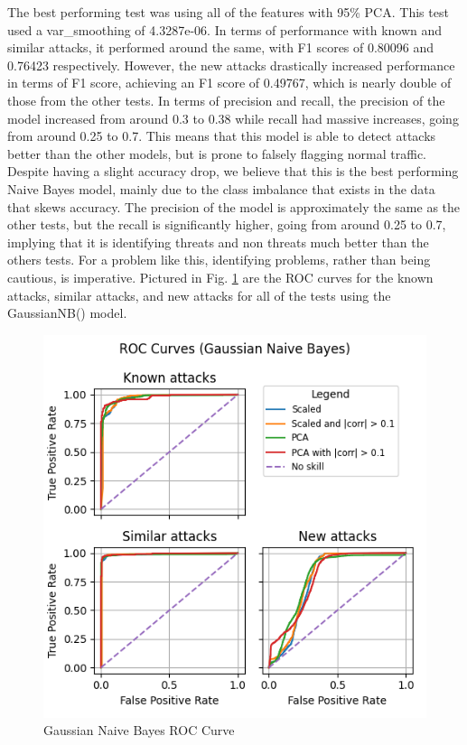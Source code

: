 The best performing test was using all of the features with 95\% PCA. This test used a var\_smoothing of 4.3287e-06. In terms of performance with known and similar attacks, it performed around the same, with F1 scores of 0.80096 and 0.76423 respectively. However, the new attacks drastically increased performance in terms of F1 score, achieving an F1 score of 0.49767, which is nearly double of those from the other tests. In terms of precision and recall, the precision of the model increased from around 0.3 to 0.38 while recall had massive increases, going from around 0.25 to 0.7. This means that this model is able to detect attacks better than the other models, but is prone to falsely flagging normal traffic. Despite having a slight accuracy drop, we believe that this is the best performing Naive Bayes model, mainly due to the class imbalance that exists in the data that skews accuracy. The precision of the model is approximately the same as the other tests, but the recall is significantly higher, going from around 0.25 to 0.7, implying that it is identifying threats and non threats much better than the others tests. For a problem like this, identifying problems, rather than being cautious, is imperative. Pictured in Fig. \ref{fig:gaus_roc} are the ROC curves for the known attacks, similar attacks, and new attacks for all of the tests using the GaussianNB() model. 

\begin{figure}
    \centering
    \includegraphics[width=\linewidth]{figures/Gaussian Naive Bayes_roc_all_small.png}
    \caption{Gaussian Naive Bayes ROC Curve}
    \label{fig:gaus_roc}
\end{figure}

